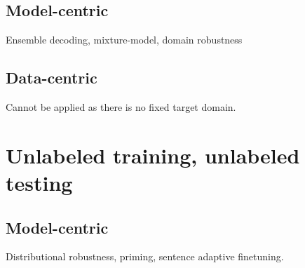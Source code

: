 \subsection{Model-centric}
Ensemble decoding, mixture-model, domain robustness
\cite{Muller20domain}
\subsection{Data-centric}
Cannot be applied as there is no fixed target domain. 
\section{Unlabeled training, unlabeled testing}
\label{sec:case4}
\subsection{Model-centric}
Distributional robustness, priming, sentence adaptive finetuning.
